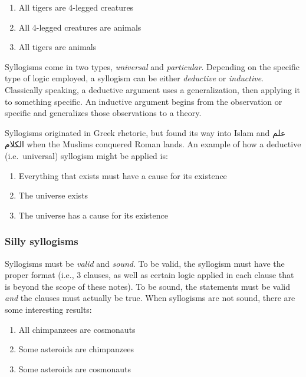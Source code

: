 \documentclass[]{book}
\providecommand{\tightlist}{%
  \setlength{\itemsep}{0pt}\setlength{\parskip}{0pt}}
\begin{document}
\begin{enumerate}
\def\labelenumi{\arabic{enumi}.}
\tightlist
\item
  All tigers are 4-legged creatures
\item
  All 4-legged creatures are animals
\item
  All tigers are animals
\end{enumerate}

Syllogisms come in two types, \emph{universal} and \emph{particular}. Depending on the specific type of logic employed, a syllogism can be either \emph{deductive} or \emph{inductive}. Classically speaking, a deductive argument uses a generalization, then applying it to something specific. An inductive argument begins from the observation or specific and generalizes those observations to a theory.

Syllogisms originated in Greek rhetoric, but found its way into Islam and علم الكلام when the Muslims conquered Roman lands. An example of how a deductive (i.e.~universal) syllogism might be applied is:

\begin{enumerate}
\def\labelenumi{\arabic{enumi}.}
\tightlist
\item
  Everything that exists must have a cause for its existence
\item
  The universe exists
\item
  The universe has a cause for its existence
\end{enumerate}

\hypertarget{silly-syllogisms}{%
\subsubsection{Silly syllogisms}\label{silly-syllogisms}}

Syllogisms must be \emph{valid} and \emph{sound}. To be valid, the syllogism must have the proper format (i.e., 3 clauses, as well as certain logic applied in each clause that is beyond the scope of these notes). To be sound, the statements must be valid \emph{and} the clauses must actually be true. When syllogisms are not sound, there are some interesting results:

\begin{enumerate}
\def\labelenumi{\arabic{enumi}.}
\tightlist
\item
  All chimpanzees are cosmonauts
\item
  Some asteroids are chimpanzees
\item
  Some asteroids are cosmonauts
\end{enumerate}
\end{document}
